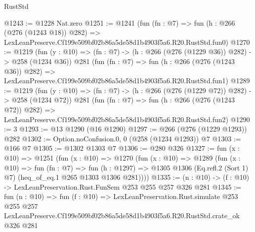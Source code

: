 \begin{lexlean}{RustStd}
\begin{coremodule}
@1243 := @1228 Nat.zero
@1251 := @1241
    (fun (fn : @7) =>
    fun (h : @266 (@276 (@1243 @18)) @282) =>
    LexLeanPreserve.Cf199e509bf02b86a5de58d1b4903f5a6.R20.RustStd.fun0)
@1270 := @1219
    (fun (y : @10) => (fn : @7) -> (h : @266 (@276 (@1229 @36)) @282) -> @258 (@1234 @36))
    @281
    (fun (fn : @7) =>
    fun (h : @266 (@276 (@1243 @36)) @282) =>
    LexLeanPreserve.Cf199e509bf02b86a5de58d1b4903f5a6.R20.RustStd.fun1)
@1289 := @1219
    (fun (y : @10) => (fn : @7) -> (h : @266 (@276 (@1229 @72)) @282) -> @258 (@1234 @72))
    @281
    (fun (fn : @7) =>
    fun (h : @266 (@276 (@1243 @72)) @282) =>
    LexLeanPreserve.Cf199e509bf02b86a5de58d1b4903f5a6.R20.RustStd.fun2)
@1290 := 3
@1293 := @13 @1290 (@16 @1290)
@1297 := @266 (@276 (@1229 @1293)) @282
@1302 := Option.noConfusion.{0, 0} (@258 (@1234 @1293)) @7
@1303 := @166 @7
@1305 := @1302 @1303 @7
@1306 := @280 @326
@1327 := fun (x : @10) =>
  @1251
    (fun (x : @10) =>
    @1270
      (fun (x : @10) =>
      @1289
        (fun (x : @10) =>
        fun (fn : @7) =>
        fun (h : @1297) =>
        @1305 @1306 (Eq.refl.{2} (Sort 1) @7) (heq_of_eq.{1} @265 @1303 @1306 @281))))
@1335 := (n : @10) -> (f : @10) -> LexLeanPreservation.Rust.FunSem @253 @255 @257 @326 @281
@1345 := fun (n : @10) =>
  fun (f : @10) =>
  LexLeanPreservation.Rust.simulate
    @253
    @255
    @257
    LexLeanPreserve.Cf199e509bf02b86a5de58d1b4903f5a6.R20.RustStd.crate_ok
    @326
    @281
\end{coremodule}
\end{lexlean}
